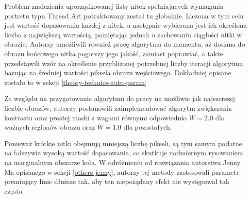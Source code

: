         Problem znalezienia uporządkowanej listy nitek spełniających wymagania portretu typu Thread Art potraktowany został tu globalnie. Liczona w tym celu jest wartość dopasowania każdej z nitek, a następnie wybierana jest ich określona liczba z największą wartością, pamiętając jednak o zachowaniu ciągłości nitki w obrazie. Autorzy umożliwili również pracę algorytmu do momentu, aż dodana do obrazu końcowego nitka pogorszy jego jakość, zamiast poprawiać, a także przedstawili wzór na określenie przybliżonej potrzebnej liczby iteracji algorytmu bazując na średniej wartości piksela obrazu wejściowego. Dokładniej opisane zostało to w sekcji \ref{theory-technics-auto-param}
        
        Ze względu na przygotowanie algorytmu do pracy na możliwie jak najszerszej liczbie obrazów, autorzy postanowili zaimplementować algorytm zwiększania kontrastu oraz prostej maski z wagami równymi odpowiednio \(W = 2.0\) dla ważnych regionów obrazu oraz \(W = 1.0\) dla pozostałych.
        
        Ponieważ krótkie nitki obejmują mniejszą liczbę pikseli, są tym samym podatne na fałszywie wysoką wartość dopasowania, co skutkuje nadmiernym rysowaniem na marginalnym obszarze koła. W odróżnieniu od rozwiązania autorstwa Jenny Ma opisanego w sekcji \ref{others-jenny}, autorzy tej metody zastosowali parametr premiujący linie dłuższe tak, aby ten niepożądany efekt nie występował tak często. 
        

